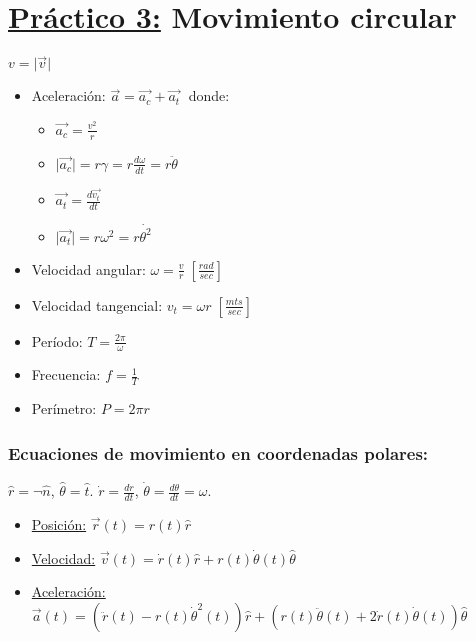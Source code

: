 \documentclass[12pt,a4paper]{article}
\providecommand{\abs}[1]{\lvert#1\rvert}
\newcommand{\PN}{\par\noindent}
\begin{document}
	\section*{\underline{Práctico 3:} Movimiento circular}
		\PN $v = \abs{\vec{v}}$
		\begin{multicols}{2}
			\begin{itemize}
				\item Aceleración: $\vec{a} = \vec{a_{c}} + \vec{a_{t}} \;$ donde:
					\begin{itemize}
						\item $\vec{a_{c}} = \frac{v^{2}}{r}$
						\item $\abs{\vec{a_{c}}} = r\gamma = r \frac{d\omega}{dt} = r \ddot{\theta}$
						\item $\vec{a_{t}} = \frac{d\vec{v_{t}}}{dt}$
						\item $\abs{\vec{a_{t}}} = r\omega^{2} = r \dot{\theta^{2}}$
					\end{itemize}
				\item Velocidad angular: $\omega = \frac{v}{r} \; [\frac{rad}{sec}]$
				\item Velocidad tangencial: $v_{t} = \omega r \; [\frac{mts}{sec}]$
				\item Período: $T = \frac{2\pi}{\omega}$
				\item Frecuencia: $f = \frac{1}{T}$
				\item Perímetro: $P = 2\pi r$
			\end{itemize}
		\end{multicols}

		\subsubsection*{Ecuaciones de movimiento en coordenadas polares:}
			\PN $\hat{r} = \neg\hat{n}$, $\hat{\theta} = \hat{t}$. $\dot{r} = \frac{dr}{dt}$, $\dot{\theta} =
				\frac{d\theta}{dt} = \omega$.
			\begin{itemize}
				\item \underline{Posición:} $\vec{r}(t) = r(t) \hat{r}$
				\item \underline{Velocidad:} $\vec{v}(t) = \dot{r}(t) \hat{r} + r(t) \dot{\theta}(t) \hat{\theta}$
				\item \underline{Aceleración:} $\vec{a}(t) = (\ddot{r}(t) - r(t) \dot{\theta}^{2}(t)) \hat{r} + (r(t)
					\ddot{\theta}(t) + 2 \dot{r}(t) \dot{\theta}(t)) \hat{\theta}$
			\end{itemize}
\end{document}
